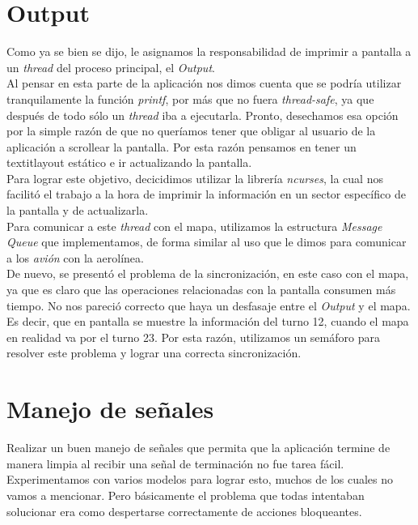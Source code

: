 \documentclass[a4paper,10pt]{article}
\begin{document}
\newpage
\section{Output}

Como ya se bien se dijo, le asignamos la responsabilidad de imprimir a pantalla a un \textit{thread} del proceso principal, el \textit{Output}. \\

Al pensar en esta parte de la aplicación nos dimos cuenta que se podría utilizar tranquilamente la función \textit{printf}, por más que no fuera \textit{thread-safe},
 ya que después de todo sólo un \textit{thread} iba a ejecutarla. Pronto, desechamos esa opción por la simple razón de que no queríamos tener que obligar al usuario 
de la aplicación a scrollear la pantalla. Por esta razón pensamos en tener un \\textit{layout} estático e ir actualizando la pantalla.\\
Para lograr este objetivo, decicidimos utilizar la librería \textit{ncurses}, la cual nos facilitó el trabajo a la hora de imprimir la información en un sector específico
de la pantalla y de actualizarla.\\

Para comunicar a este \textit{thread} con el mapa, utilizamos la estructura \textit{Message Queue} que implementamos, de forma similar al uso que le dimos 
para comunicar a los \textit{avión} con la aerolínea.\\

De nuevo, se presentó el problema de la sincronización, en este caso con el mapa, ya que es claro que las operaciones relacionadas con la pantalla consumen más 
tiempo. No nos pareció correcto que haya un desfasaje entre el \textit{Output} y el mapa. Es decir, que en pantalla se muestre la información del turno 12, 
cuando el mapa en realidad va por el turno 23. Por esta razón, utilizamos un semáforo para resolver este problema y lograr una correcta sincronización.

\newpage
\section{Manejo de señales}
Realizar un buen manejo de señales que permita que la aplicación termine de manera limpia al recibir una señal de terminación no fue tarea fácil.
Experimentamos con varios modelos para lograr esto, muchos de los cuales no vamos a mencionar.
Pero básicamente el problema que todas intentaban solucionar era como despertarse correctamente de acciones bloqueantes.
\end{document}
